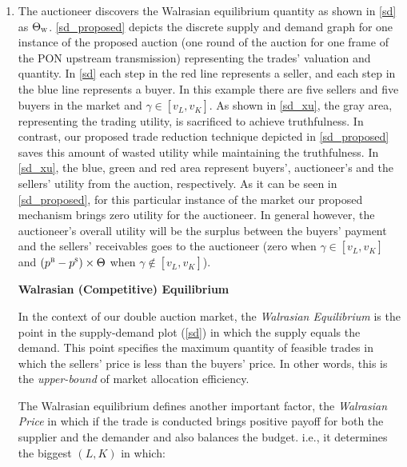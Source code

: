 \begin{enumerate}
\item The auctioneer discovers the Walrasian equilibrium quantity as shown in \autoref{sd} as $\Theta_\textsc{w}$. \autoref{sd_proposed} depicts the discrete supply and demand graph for one instance of the proposed auction (one round of the auction for one frame of the \ac{PON} upstream transmission) representing the trades' valuation and quantity. In \autoref{sd} each step in the red line represents a seller, and each step in the blue line represents a buyer. In this example there are five sellers and five buyers in the market and $\gamma \in [{v^{}_L} , {v^{}_K}]$. As shown in \autoref{sd_xu}, the gray area, representing the trading utility, is sacrificed to achieve truthfulness. In contrast, our proposed trade reduction technique depicted in \autoref{sd_proposed} saves this amount of wasted utility while maintaining the truthfulness. In \autoref{sd_xu}, the blue, green and red area represent buyers', auctioneer's and the sellers' utility from the auction, respectively. As it can be seen in \autoref{sd_proposed}, for this particular instance of the market our proposed mechanism brings zero utility for the auctioneer. In general however, the auctioneer's overall utility will be the surplus between the buyers' payment and the sellers' receivables goes to the auctioneer (zero when $\gamma \in [{v^{}_L} , {v^{}_K}]$ and $(p^\textsc{b} - p^\textsc{s}) \times \Theta$ when $\gamma \notin [{v^{}_L} , {v^{}_K}]$).




\begin{Definition}
\textbf{Walrasian (Competitive) Equilibrium}

In the context of our double auction market, the \textit{ Walrasian Equilibrium} is the point in the supply-demand plot (\autoref{sd}) in which the supply equals the demand. This point specifies the maximum quantity of feasible trades in which the sellers' price is less than the buyers' price. In other words, this is the \textit{upper-bound} of market allocation efficiency.
\end{Definition}

The Walrasian equilibrium defines another important factor, the \textit{Walrasian Price} in which if the trade is conducted brings positive payoff for both the supplier and the demander and also balances the budget. i.e., it determines the biggest $(L, K)$ in which:


\end{enumerate}
